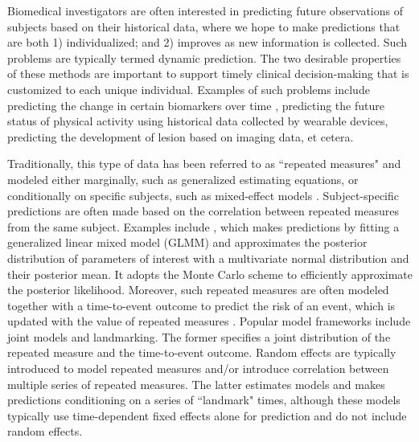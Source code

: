 \documentclass[12pt]{article}
\begin{document}

Biomedical investigators are often interested in predicting future
observations of subjects based on their historical data, where we hope to make predictions that are both 1) individualized; and 2) improves as new information is collected. Such problems are typically termed dynamic prediction. The two desirable properties of these methods are important to support timely clinical decision-making that is customized to each unique individual. Examples of such problems include predicting the change in certain biomarkers over time \citep{leroux2016}, predicting the future status of physical activity using historical data collected by wearable devices, predicting the development of lesion based on imaging data, et cetera. 

Traditionally, this type of data has been referred to as ``repeated measures" and modeled either marginally, such as generalized estimating
equations, or conditionally on specific subjects, such as mixed-effect
models \citep{davidian2003, Laird1982, liang1986, lindstrom1990}. Subject-specific predictions are often made based on the correlation between repeated measures from the same subject. Examples include \citet{GLMMadaptive}, which makes predictions by fitting a generalized linear mixed model (GLMM) and approximates the posterior distribution of parameters of interest with a multivariate normal distribution and their posterior mean. It adopts the Monte Carlo scheme to efficiently approximate the posterior likelihood. Moreover, such repeated measures are often modeled together with a time-to-event outcome to predict the risk of an event, which is updated with the value of repeated measures \citep{Rizopoulos2017, suresh2017}. Popular model frameworks include joint models and landmarking. The former specifies a joint distribution of the repeated measure and the time-to-event outcome. Random effects are typically introduced to model repeated measures and/or introduce correlation between multiple series of repeated measures. The latter estimates models and makes predictions conditioning on a series of ``landmark" times, although these models typically use time-dependent fixed effects alone for prediction and do not include random effects. \citep{vanHouwelingen2007, Rizopoulos2011}
\end{document}
